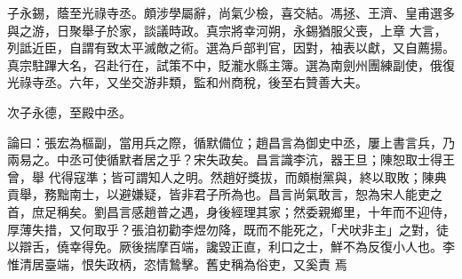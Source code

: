 \begin{pinyinscope}
 子永錫，蔭至光祿寺丞。頗涉學屬辭，尚氣少檢，喜交結。馮拯、王濟、皇甫選多與之游，日聚舉子於家，談議時政。真宗將幸河朔，永錫猶服父喪，上章
 大言，列詆近臣，自謂有致太平滅敵之術。選為戶部判官，因對，袖表以獻，又自薦揚。真宗駐蹕大名，召赴行在，試策不中，貶瀧水縣主簿。選為南劍州團練副使，俄復光祿寺丞。六年，又坐交游非類，監和州商稅，後至右贊善大夫。



 次子永德，至殿中丞。



 論曰：張宏為樞副，當用兵之際，循默備位；趙昌言為御史中丞，屢上書言兵，乃兩易之。中丞可使循默者居之乎？宋失政矣。昌言識李沆，器王旦；陳恕取士得王曾，舉
 代得寇準；皆可謂知人之明。然趙好獎拔，而頗樹黨與，終以取敗；陳典貢舉，務黜南士，以避嫌疑，皆非君子所為也。昌言尚氣敢言，恕為宋人能吏之首，庶足稱矣。劉昌言感趙普之遇，身後經理其家；然委親鄉里，十年而不迎侍，厚薄失措，又何取乎？張洎初勸李煜勿降，既而不能死之，「犬吠非主」之對，徒以辯舌，僥幸得免。厥後揣摩百端，讒毀正直，利口之士，鮮不為反復小人也。李惟清居臺端，恨失政柄，恣情鷙擊。舊史稱為俗吏，又奚責
 焉



\end{pinyinscope}
